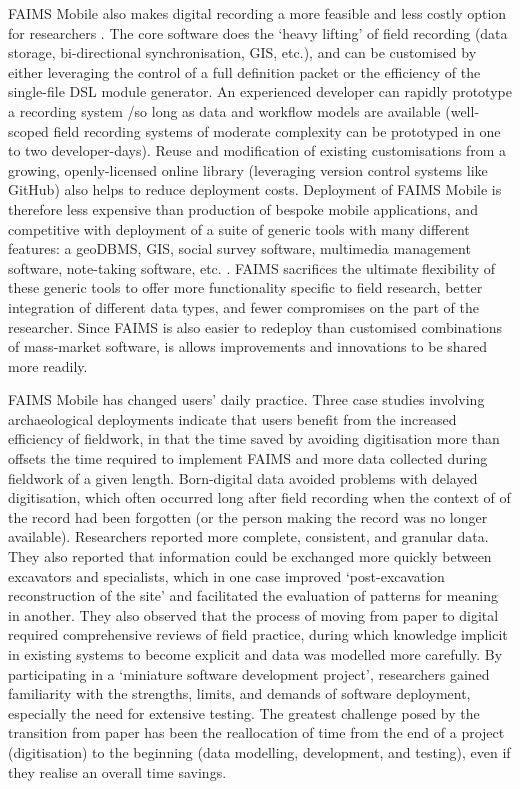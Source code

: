 \documentclass[preprint,12pt, a4paper]{elsarticle}
\begin{document}
FAIMS Mobile also makes digital recording a more feasible and less costly option for researchers \cite{Sobotkova2016-mx, Sobotkova2015-lq}. The core software does the `heavy lifting' of field recording (data storage, bi-directional synchronisation, GIS, etc.), and can be customised by either leveraging the control of a full definition packet or the efficiency of the single-file DSL module generator. An experienced developer can rapidly prototype a recording system /so long as data and workflow models are available (well-scoped field recording systems of moderate complexity can be prototyped in one to two developer-days). Reuse and modification of existing customisations from a growing, openly-licensed online library (leveraging version control systems like GitHub) also helps to reduce deployment costs\cite{Ross2015-mo}. Deployment of FAIMS Mobile is therefore less expensive than production of bespoke mobile applications, and competitive with deployment of a suite of generic tools with many different features: a geoDBMS, GIS, social survey software, multimedia management software, note-taking software, etc. \cite{Carter2016-jm}.
FAIMS sacrifices the ultimate flexibility of these generic tools to offer more functionality specific to field research, better integration of different data types, and fewer compromises on the part of the researcher. Since FAIMS is also easier to redeploy than customised combinations of mass-market software, is allows improvements and innovations to be shared more readily\cite{Ross2015-mo}.  

FAIMS Mobile has changed users' daily practice. Three case studies involving archaeological deployments \cite{Sobotkova2016-mx} indicate that users benefit from the increased efficiency of fieldwork, in that the time saved by avoiding digitisation more than offsets the time required to implement FAIMS and more data collected during fieldwork of a given length. Born-digital data avoided problems with delayed digitisation, which often occurred long after field recording when the context of of the record had been forgotten (or the person making the record was no longer available). Researchers reported more complete, consistent, and granular data. They also reported that information could be exchanged more quickly between excavators and specialists, which in one case improved `post-excavation reconstruction of the site' and facilitated the evaluation of patterns for meaning in another. They also observed that the process of moving from paper to digital required comprehensive reviews of field practice, during which knowledge implicit in existing systems to become explicit and data was modelled more carefully. By participating in a `miniature software development project', researchers gained familiarity with the strengths, limits, and demands of software deployment, especially the need for extensive testing. The greatest challenge posed by the transition from paper has been the reallocation of time from the end of a project (digitisation) to the beginning (data modelling, development, and testing), even if they realise an overall time savings. 
\end{document}
